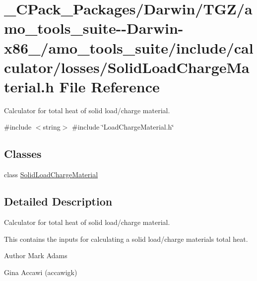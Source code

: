 \hypertarget{___c_pack___packages_2_darwin_2_t_g_z_2amo__tools__suite--_darwin-x86__64_2amo__tools__suite_2inb6bdc51fe912498492e2cc7f9515477d}{}\section{\+\_\+\+C\+Pack\+\_\+\+Packages/\+Darwin/\+T\+G\+Z/amo\+\_\+tools\+\_\+suite-\/-\/\+Darwin-\/x86\+\_/amo\+\_\+tools\+\_\+suite/include/calculator/losses/\+Solid\+Load\+Charge\+Material.h File Reference}
\label{___c_pack___packages_2_darwin_2_t_g_z_2amo__tools__suite--_darwin-x86__64_2amo__tools__suite_2inb6bdc51fe912498492e2cc7f9515477d}


Calculator for total heat of solid load/charge material.  


{\ttfamily \#include $<$string$>$}\newline
{\ttfamily \#include \char`\"{}Load\+Charge\+Material.\+h\char`\"{}}\newline
\subsection*{Classes}
\begin{DoxyCompactItemize}
\item 
class \hyperlink{class_solid_load_charge_material}{Solid\+Load\+Charge\+Material}
\end{DoxyCompactItemize}


\subsection{Detailed Description}
Calculator for total heat of solid load/charge material. 

This contains the inputs for calculating a solid load/charge material\textquotesingle{}s total heat.

\begin{DoxyAuthor}{Author}
Mark Adams 

Gina Accawi (accawigk) 
\end{DoxyAuthor}
